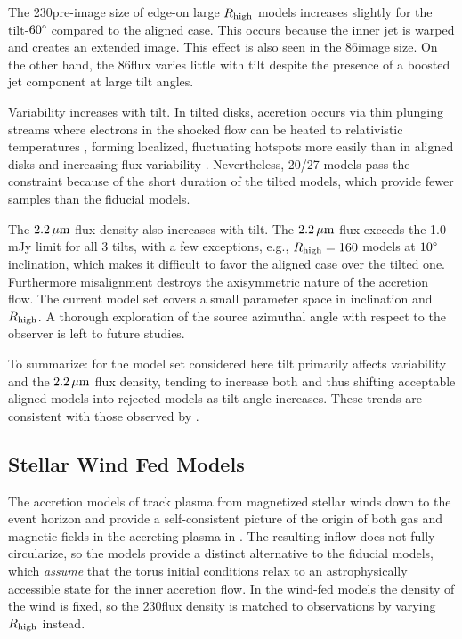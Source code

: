 The 230\GHz pre-image size of edge-on large $R_\mathrm{high}$ models  increases slightly for the tilt-$60\degree$ compared to the aligned case.
This occurs because the inner jet is warped and creates an extended image.
This effect is also seen in the 86\GHz image size.
On the other hand, the 86\GHz flux varies little with tilt despite the presence of a boosted jet component at large tilt angles.

Variability increases with tilt.
In tilted disks, accretion occurs via thin plunging streams \citep[e.g.,][]{Fragile2007} where electrons in the shocked flow can be heated to relativistic temperatures \citep[e.g.,][]{Dexter2013, 2014ApJ...780...81G, White2019}, forming localized, fluctuating hotspots more easily than in aligned disks and increasing flux variability \citep{Chatterjee2020, 2021arXiv210412896W}.  Nevertheless, 20/27 models pass the  constraint because of the short duration of the tilted models, which provide fewer  samples than the fiducial models.

The $2.2\,\mu\mathrm{m}$ flux density also increases with tilt.
The $2.2\,\mu\mathrm{m}$ flux exceeds the 1.0\,mJy limit for all 3 tilts, with a few exceptions, e.g., $R_\mathrm{high}=160$ models at $10\degree$ inclination, which makes it difficult to favor the aligned case over the tilted one.
Furthermore misalignment destroys the axisymmetric nature of the accretion flow.
The current model set covers a small parameter space in inclination and $R_\mathrm{high}$.
A thorough exploration of the source azimuthal angle with respect to the observer is left to future studies.

To summarize: for the model set considered here tilt primarily affects variability and the $2.2\,\mu\mathrm{m}$ flux density, tending to increase both and thus shifting acceptable aligned models into rejected models as tilt angle increases.
These trends are consistent with those observed by \cite{2021arXiv210412896W}.

\subsection{Stellar Wind Fed Models}

The accretion models of \cite{2020ApJ...896L...6R, 2020MNRAS.492.3272R, 2018MNRAS.478.3544R} track plasma from  magnetized stellar winds down to the event horizon and provide a self-consistent picture of the origin of both gas and magnetic fields in the accreting plasma in \sgra.
The resulting inflow does not fully circularize, so the models provide a distinct alternative to the fiducial models, which {\em assume} that the torus initial conditions relax to an astrophysically accessible state for the inner accretion flow.
In the wind-fed models the density of the wind is fixed, so the 230\GHz flux density is matched to observations by varying $R_\mathrm{high}$ instead.

